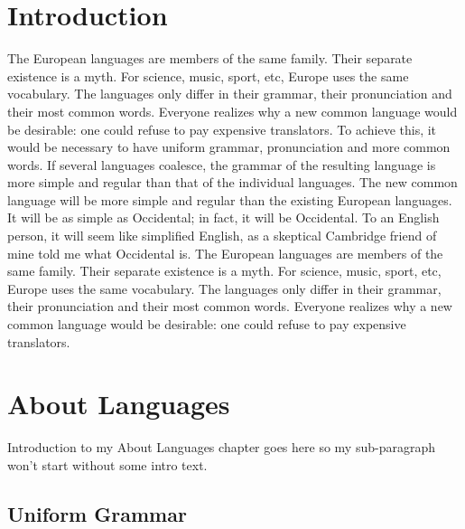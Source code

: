 \def\bibliocommand{}
\def\bibliostyle{apacite}
\def\myauthor{Tim Brandes}

\def\language{German}
\def\format{complete}
\chapter{Introduction}
\label{introduction}

The European languages are members of the same family. Their separate existence is a myth. For science, music, sport, etc, Europe uses the same vocabulary. The languages only differ in their grammar, their pronunciation and their most common words. Everyone realizes why a new common language would be desirable: one could refuse to pay expensive translators. To achieve this, it would be necessary to have uniform grammar, pronunciation and more common words. If several languages coalesce, the grammar of the resulting language is more simple and regular than that of the individual languages. The new common language will be more simple and regular than the existing European languages. It will be as simple as Occidental; in fact, it will be Occidental. To an English person, it will seem like simplified English, as a skeptical Cambridge friend of mine told me what Occidental is. The European languages are members of the same family. Their separate existence is a myth. For science, music, sport, etc, Europe uses the same vocabulary. The languages only differ in their grammar, their pronunciation and their most common words. Everyone realizes why a new common language would be desirable: one could refuse to pay expensive translators.

\pagebreak 

\chapter{About Languages}
\label{aboutlanguages}

Introduction to my About Languages chapter goes here so my sub-paragraph won't start without some intro text.

\section{Uniform Grammar}
\label{uniformgrammar}

